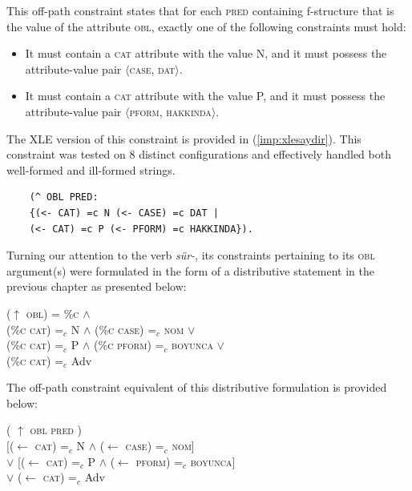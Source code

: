 This off-path constraint states that for each \textsc{pred} containing f-structure that is the value of the attribute \textsc{obl}, exactly one of the following constraints must hold:

\begin{itemize}
\item It must contain a \textsc{cat} attribute with the value N, and it must possess the attribute-value pair $\langle$\textsc{case, dat}$\rangle$.
\item It must contain a \textsc{cat} attribute with the value P, and it must possess the attribute-value pair $\langle$\textsc{pform, hakkında}$\rangle$.

\end{itemize}

The XLE version of this constraint is provided in (\ref{imp:xlesaydir}). This constraint was tested on 8 distinct configurations and effectively handled both well-formed and ill-formed strings.

\pex
\label{imp:xlesaydir}
\vspace{-18pt}

\begin{lstlisting}
    (^ OBL PRED: 
    {(<- CAT) =c N (<- CASE) =c DAT | 
    (<- CAT) =c P (<- PFORM) =c HAKKINDA}).
\end{lstlisting}
\xe

Turning our attention to the verb \textit{sür-}, its constraints pertaining to its \textsc{obl} argument(s) were formulated in the form of a distributive statement in the previous chapter as presented below:

\ex
\label{sur-liberal}
($\uparrow$ \textsc{obl}) = \%\textsc{c} $\land$ \\
\vspace{3pt}\text{[[}(\%\textsc{c cat}) =$_c$ N $\land$ (\%\textsc{c case}) =$_c$ \textsc{nom}\text{]} $\lor$ \\
\text{[}(\%\textsc{c cat}) =$_c$ P $\land$ (\%\textsc{c pform}) =$_c$ \textsc{boyunca}\text{]} $\lor$ \\
(\%\textsc{c cat}) =$_c$ Adv\text{]}
\xe

The off-path constraint equivalent of this distributive formulation is provided below:

\ex
\label{sur-cons}
( $\uparrow$  \textsc{obl} \hspace*{6em} \textsc{pred} \hspace*{9.8em}) \\
\hspace*{3.2em} [($\leftarrow$ \textsc{cat}) =$_{c}$ N \hspace*{.4em} $\land$ \hspace*{.4em} ($\leftarrow$ \textsc{case}) =$_{c}$ \textsc{nom}] \\
\hspace*{.9em} $\lor$ [($\leftarrow$ \textsc{cat}) =$_{c}$ P \hspace*{.4em} $\land$ \hspace*{.4em} ($\leftarrow$ \textsc{pform}) =$_{c}$ \textsc{boyunca}] \\
\hspace*{.9 em} $\lor$ ($\leftarrow$ \textsc{cat}) =$_{c}$ Adv
\xe

